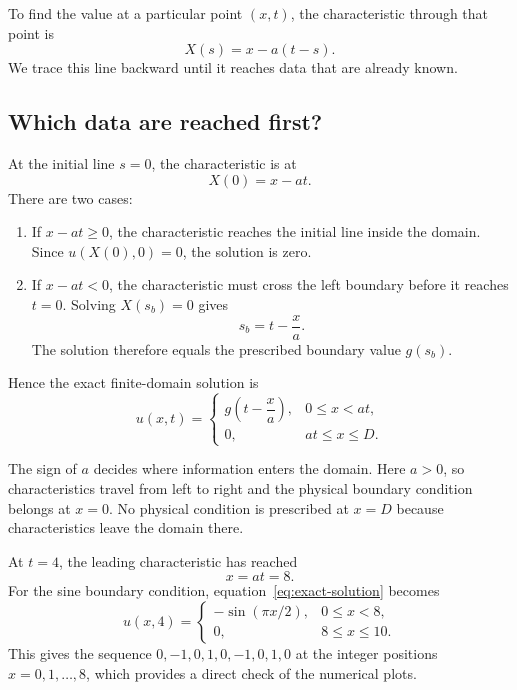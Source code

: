 To find the value at a particular point $(x,t)$, the characteristic through
that point is
\begin{equation}
 X(s)=x-a(t-s).
\end{equation}
We trace this line backward until it reaches data that are already known.

\subsection{Which data are reached first?}

At the initial line $s=0$, the characteristic is at
\[
 X(0)=x-at.
\]
There are two cases:
\begin{enumerate}
 \item If $x-at\geq0$, the characteristic reaches the initial line inside the
 domain. Since $u(X(0),0)=0$, the solution is zero.
 \item If $x-at<0$, the characteristic must cross the left boundary before it
 reaches $t=0$. Solving $X(s_b)=0$ gives
 \[
 s_b=t-\frac{x}{a}.
 \]
 The solution therefore equals the prescribed boundary value $g(s_b)$.
\end{enumerate}
Hence the exact finite-domain solution is
\begin{equation}
 \boxed{
 u(x,t)=
 \begin{cases}
 g\!\left(t-\dfrac{x}{a}\right),&0\leq x<at,\\[2mm]
 0,&at\leq x\leq D.
 \end{cases}}
 \label{eq:exact-solution}
\end{equation}

The sign of $a$ decides where information enters the domain. Here $a>0$, so
characteristics travel from left to right and the physical boundary condition
belongs at $x=0$. No physical condition is prescribed at $x=D$ because
characteristics leave the domain there.

At $t=4$, the leading characteristic has reached
\[
 x=at=8.
\]
For the sine boundary condition, equation~\eqref{eq:exact-solution} becomes
\begin{equation}
 u(x,4)=
 \begin{cases}
 -\sin(\pi x/2),&0\leq x<8,\\
 0,&8\leq x\leq10.
 \end{cases}
 \label{eq:exact-sine-t4}
\end{equation}
This gives the sequence $0,-1,0,1,0,-1,0,1,0$ at the integer positions
$x=0,1,\ldots,8$, which provides a direct check of the numerical plots.

